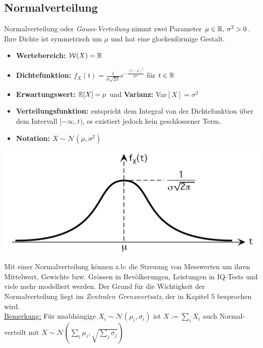 \subsection{Normalverteilung}
Normalverteilung oder \textit{Gauss-Verteilung} nimmt zwei Parameter $\mu \in \mathbb{R},\: \sigma^2 > 0$. Ihre Dichte ist symmetrisch um $\mu$ und hat eine glockenförmige Gestalt.
\begin{itemize}
\item \textbf{Wertebereich:} $\mathcal{W}(X) = \mathbb{R}$
\item \textbf{Dichtefunktion:} $f_X(t) = \frac{1}{\sigma \sqrt{2\pi}}e^{- \frac{(t-\mu)^2}{2\sigma^2}}$ für $t\in \mathbb{R}$
\item \textbf{Erwartungswert:} $\mathbb{E}[X] = \mu$ und \textbf{Varianz:} Var$[X] = \sigma^2$
\item \textbf{Verteilungsfunktion:} entspricht dem Integral von der Dichtefunktion über dem Intervall $[-\infty, t)$, es existiert jedoch kein geschlossener Term.
\item \textbf{Notation:} $X \sim \mathcal{N}(\mu, \sigma^2)$
\end{itemize}
\begin{center}
\includegraphics[scale=0.3]{normalverteilung.png}
\end{center}
Mit einer Normalverteilung können z.b: die Streuung von Messwerten um ihren Mittelwert, Gewichte bzw. Grössen in Bevölkerungen, Leistungen in IQ-Tests und viele mehr modelliert werden. Der Grund für die Wichtigkeit der Normalverteilung liegt im \textit{Zentralen Grenzwertsatz}, der in Kapitel 5 besprochen wird. \\

\underline{Bemerkung:} Für unabhängige $X_i \sim \mathcal{N}(\mu_i, \sigma_i)$ ist $X := \sum_i X_i$ auch Normal-verteilt mit $X \sim \mathcal{N}(\sum_i \mu_i, \sqrt{\sum_j \sigma_j})$

